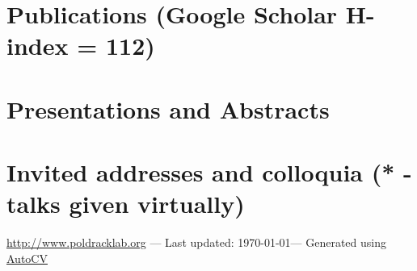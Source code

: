 \documentclass[10pt, letterpaper]{article}
\begin{document}
\section*{Publications (Google Scholar H-index = 112)}



\section*{Presentations and Abstracts}



\section*{Invited addresses and colloquia (* - talks given virtually)}



\vfill{}
\hrulefill

\begin{center}
{\footnotesize \href{http://www.poldracklab.org}{http://www.poldracklab.org} — Last updated: \today — Generated using \href{https://github.com/poldrack/autoCV}{AutoCV} 
}
\end{center}
\end{document}
